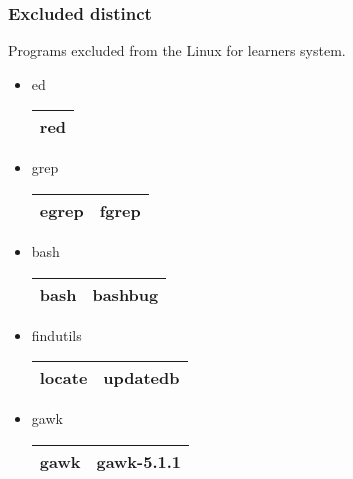 \newpage

\subsubsection{Excluded distinct}

Programs excluded from the Linux for learners system.

\begin{itemize}
    \item ed 
        \begin{center}
            \begin{tabular}{|c|}
                \hline
                red \\
                \hline
            \end{tabular}
        \end{center}
    \item grep
        \begin{center}
            \begin{tabular}{|c|c|}
                \hline
                egrep & fgrep \\
                \hline
            \end{tabular}
        \end{center}
    \item bash
        \begin{center}
            \begin{tabular}{|c|c|}
                \hline
                bash & bashbug \\
                \hline
            \end{tabular}
        \end{center}
    \item findutils
        \begin{center}
            \begin{tabular}{|c|c|}
                \hline
                locate & updatedb \\
                \hline
            \end{tabular}
        \end{center}
    \item gawk
        \begin{center}
            \begin{tabular}{|c|c|}
                \hline
                gawk & gawk-5.1.1 \\
                \hline
            \end{tabular}
        \end{center}

\end{itemize}
